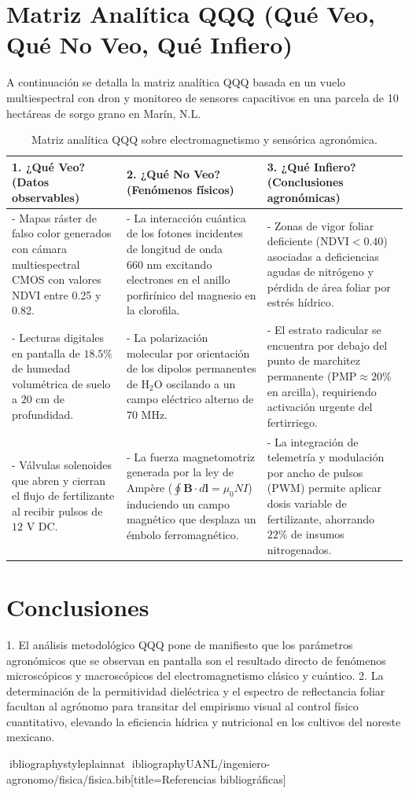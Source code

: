 \documentclass[spanish,letterpaper,oneside]{article}
\begin{document}
\section{Matriz Analítica QQQ (Qué Veo, Qué No Veo, Qué Infiero)}
A continuación se detalla la matriz analítica QQQ basada en un vuelo multiespectral con dron y monitoreo de sensores capacitivos en una parcela de 10 hectáreas de sorgo grano en Marín, N.L.

\begin{table}[htbp]
\centering
\small
\caption{Matriz analítica QQQ sobre electromagnetismo y sensórica agronómica.}
\label{tab:matriz-qqq}
\begin{tabularx}{\textwidth}{@{}Y Y Y@{}}
\toprule
\textbf{1. ¿Qué Veo? (Datos observables)} & \textbf{2. ¿Qué No Veo? (Fenómenos físicos)} & \textbf{3. ¿Qué Infiero? (Conclusiones agronómicas)} \\
\midrule
- Mapas ráster de falso color generados con cámara multiespectral CMOS con valores NDVI entre 0.25 y 0.82. &
- La interacción cuántica de los fotones incidentes de longitud de onda $660\text{ nm}$ excitando electrones en el anillo porfirínico del magnesio en la clorofila. &
- Zonas de vigor foliar deficiente ($\mathrm{NDVI} < 0.40$) asociadas a deficiencias agudas de nitrógeno y pérdida de área foliar por estrés hídrico. \\
\addlinespace
- Lecturas digitales en pantalla de $18.5\%$ de humedad volumétrica de suelo a $20\text{ cm}$ de profundidad. &
- La polarización molecular por orientación de los dipolos permanentes de $\mathrm{H}_2\mathrm{O}$ oscilando a un campo eléctrico alterno de $70\text{ MHz}$. &
- El estrato radicular se encuentra por debajo del punto de marchitez permanente ($\mathrm{PMP} \approx 20\%$ en arcilla), requiriendo activación urgente del fertirriego. \\
\addlinespace
- Válvulas solenoides que abren y cierran el flujo de fertilizante al recibir pulsos de $12\text{ V DC}$. &
- La fuerza magnetomotriz generada por la ley de Ampère ($\oint \mathbf{B}\cdot d\mathbf{l} = \mu_0 N I$) induciendo un campo magnético que desplaza un émbolo ferromagnético. &
- La integración de telemetría y modulación por ancho de pulsos (PWM) permite aplicar dosis variable de fertilizante, ahorrando $22\%$ de insumos nitrogenados. \\
\bottomrule
\end{tabularx}
\end{table}

\section{Conclusiones}
1. El análisis metodológico QQQ pone de manifiesto que los parámetros agronómicos que se observan en pantalla son el resultado directo de fenómenos microscópicos y macroscópicos del electromagnetismo clásico y cuántico.
2. La determinación de la permitividad dieléctrica y el espectro de reflectancia foliar facultan al agrónomo para transitar del empirismo visual al control físico cuantitativo, elevando la eficiencia hídrica y nutricional en los cultivos del noreste mexicano.

\newpage
ibliographystyle{plainnat}
ibliography{UANL/ingeniero-agronomo/fisica/fisica.bib}[title={Referencias bibliográficas}]
\end{document}
